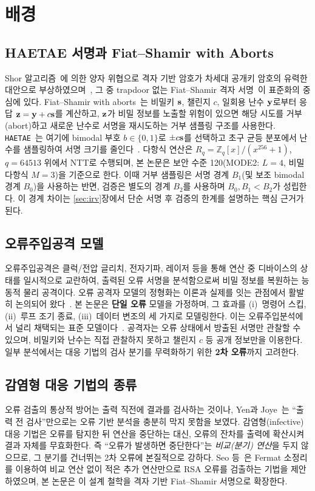 \section{배경}
\label{sec:bg}

\subsection{HAETAE 서명과 Fiat--Shamir with Aborts}
Shor 알고리즘~\cite{shor1994}에 의한 양자 위협으로 격자 기반 암호가 차세대 공개키 암호의 유력한
대안으로 부상하였으며~\cite{peikert2016}, 그 중 trapdoor 없는 Fiat--Shamir 격자
서명~\cite{lyubashevsky2012}이 표준화의 중심에 있다. Fiat--Shamir with
aborts~\cite{lyubashevsky2009}는 비밀키 $\mathbf{s}$, 챌린지 $c$, 일회용 난수
$\mathbf{y}$로부터 응답 $\mathbf{z}=\mathbf{y}+c\mathbf{s}$를 계산하고, $\mathbf{z}$가 비밀 정보를 노출할 위험이 있으면
해당 시도를 거부(abort)하고 새로운 난수로 서명을 재시도하는 거부 샘플링 구조를 사용한다.
\texttt{HAETAE}~\cite{haetae}는 여기에 bimodal 부호 $b\in\{0,1\}$로 $\pm c\mathbf{s}$를 선택하고
초구 균등 분포에서 난수를 샘플링하여 서명 크기를 줄인다~\cite{bliss2013}. 다항식 연산은
$R_q=\mathbb{Z}_q[x]/(x^{256}+1)$, $q=64513$ 위에서 NTT로 수행되며, 본 논문은 보안 수준
120(MODE2: $L=4$, 비밀 다항식 $M=3$)을 기준으로 한다. 이때 거부 샘플링은 서명 경계 $B_1$(및
보조 bimodal 경계 $B_0$)을 사용하는 반면, 검증은 별도의 경계 $B_2$를 사용하며 \textbf{$B_0,B_1<B_2$}가
성립한다. 이 경계 차이는 \ref{sec:irv}장에서 단순 서명 후 검증의 한계를 설명하는 핵심 근거가 된다.

\subsection{오류주입공격 모델}
오류주입공격은 클럭/전압 글리치, 전자기파, 레이저 등을 통해 연산 중 디바이스의 상태를 일시적으로
교란하여, 출력된 오류 서명을 분석함으로써 비밀 정보를 복원하는 능동적 물리 공격이다. 오류 공격자 모델의 정형화는 이론과 실제를 잇는 관점에서 활발히 논의되어
왔다~\cite{toprakhisar2024,spruyt2021}. 본 논문은 \textbf{단일 오류} 모델을 가정하며, 그 효과를
(i)~명령어 스킵, (ii)~루프 조기 종료, (iii)~데이터 변조의 세 가지로 모델링한다. 이는 오류주입분석에서 널리 채택되는 표준 모델이다~\cite{espitau2016,bindel2016,ravi2022survey}. 공격자는 오류 상태에서 방출된 서명만
관찰할 수 있으며, 비밀키와 난수는 직접 관찰하지 못하고 챌린지 $c$ 등 공개 정보만을 이용한다. 일부
분석에서는 대응 기법의 검사 분기를 무력화하기 위한 \textbf{2차 오류}까지 고려한다.

\subsection{감염형 대응 기법의 종류}
오류 검출의 통상적 방어는 출력 직전에 결과를 검사하는 것이나, Yen과 Joye~\cite{yen2000}는 ``출력
전 검사''만으로는 오류 기반 분석을 충분히 막지 못함을 보였다. 감염형(infective) 대응 기법은 오류를
탐지한 뒤 연산을 중단하는 대신, 오류의 잔차를 출력에 확산시켜 결과 자체를 무효화한다. 즉 ``오류가
발생하면 중단한다''는 \emph{비교(분기) 연산}을 두지 않으므로, 그 분기를 건너뛰는 2차 오류에
본질적으로 강하다. Seo 등~\cite{seo2013}은
Fermat 소정리를 이용하여 비교 연산 없이 적은 추가 연산만으로 RSA 오류를 검출하는 기법을
제안하였으며, 본 논문은 이 설계 철학을 격자 기반 Fiat--Shamir 서명으로 확장한다.
